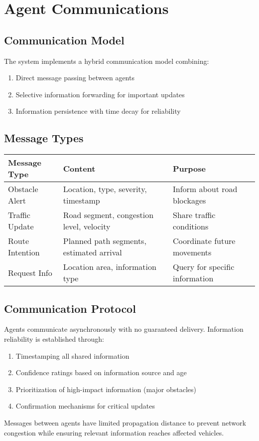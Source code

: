 \documentclass[a4paper, 11pt]{article}
\begin{document}
\section{Agent Communications}
\subsection{Communication Model}
The system implements a hybrid communication model combining:
\begin{enumerate}
    \item Direct message passing between agents
    \item Selective information forwarding for important updates
    \item Information persistence with time decay for reliability
\end{enumerate}

\subsection{Message Types}
\begin{tabularx}{\textwidth}{|X|X|X|}
\hline
\textbf{Message Type} & \textbf{Content} & \textbf{Purpose} \\
\hline
Obstacle Alert & Location, type, severity, timestamp & Inform about road blockages \\
\hline
Traffic Update & Road segment, congestion level, velocity & Share traffic conditions \\
\hline
Route Intention & Planned path segments, estimated arrival & Coordinate future movements \\
\hline
Request Info & Location area, information type & Query for specific information \\
\hline
\end{tabularx}

\subsection{Communication Protocol}
Agents communicate asynchronously with no guaranteed delivery. Information reliability is established through:

\begin{enumerate}
    \item Timestamping all shared information
    \item Confidence ratings based on information source and age
    \item Prioritization of high-impact information (major obstacles)
    \item Confirmation mechanisms for critical updates
\end{enumerate}

Messages between agents have limited propagation distance to prevent network congestion while ensuring relevant information reaches affected vehicles.
\end{document}
